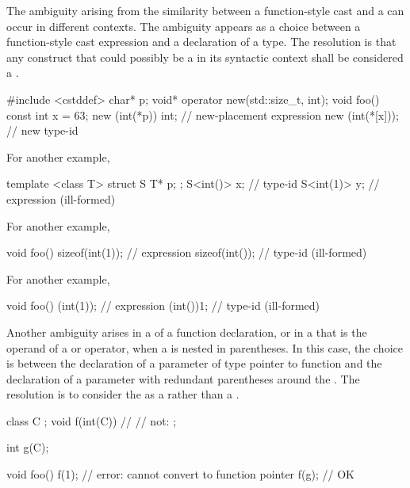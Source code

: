 \pnum
The ambiguity arising from the similarity between a function-style
cast and a
can occur in different contexts.
The ambiguity appears as a choice between a function-style cast
expression and a declaration of a type.
The resolution is that any construct that could possibly be a
in its syntactic context shall be considered a
.

\pnum
\enterexample

\begin{codeblock}
#include <cstddef>
char* p;
void* operator new(std::size_t, int);
void foo()  {
  const int x = 63;
  new (int(*p)) int;            // new-placement expression
  new (int(*[x]));              // new type-id
}
\end{codeblock}

\pnum
For another example,

\begin{codeblock}
template <class T>
struct S {
  T* p;
};
S<int()> x;                     // type-id
S<int(1)> y;                    // expression (ill-formed)
\end{codeblock}

\pnum
For another example,

\begin{codeblock}
void foo() {
  sizeof(int(1));               // expression
  sizeof(int());                // type-id (ill-formed)
}
\end{codeblock}

\pnum
For another example,

\begin{codeblock}
void foo() {
  (int(1));                     // expression
  (int())1;                     // type-id (ill-formed)
}
\end{codeblock}
\exitexample

\pnum
Another ambiguity arises in a
of a function declaration, or in a
that is the operand of a
or
operator, when a
is nested in parentheses.
In this case, the choice is between the declaration of a parameter of type
pointer to function and the declaration of a parameter with redundant
parentheses around the
.
The resolution is to consider the
as a
rather than a
.
\enterexample

\begin{codeblock}
class C { };
void f(int(C)) { }              // 
                                // not: ;

int g(C);

void foo() {
  f(1);                         // error: cannot convert  to function pointer
  f(g);                         // OK
}
\end{codeblock}


